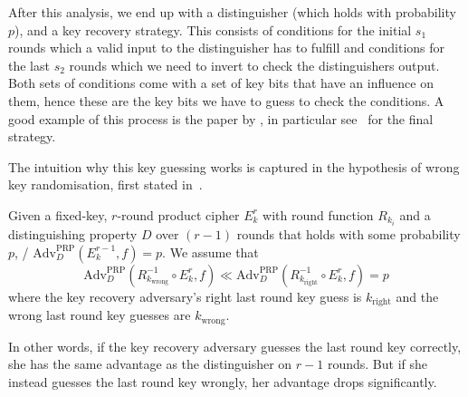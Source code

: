After this analysis, we end up with a distinguisher (which holds with probability~$p$), and a key recovery strategy.
This consists of conditions for the initial $s_1$ rounds which a valid input to the distinguisher has to fulfill and conditions for the last $s_2$ rounds which we need to invert to check the distinguishers output.
Both sets of conditions come with a set of key bits that have an influence on them, hence these are the key bits we have to guess to check the conditions.
A good example of this process is the paper by \citeauthor{INDOCRYPT:LalRas17}, in particular see~\cite[Section~6.3, pp.~14f]{INDOCRYPT:LalRas17} for the final strategy.

The intuition why this key guessing works is captured in the hypothesis of wrong key randomisation, first stated in~\cite[Section~4]{EC:HarKraMas95}.
\begin{hypothesis}\label{hypo:rand}
    Given a fixed-key, $r$-round product cipher $E_k^r$ with round function $R_{k_i}$ and a distinguishing property $D$ over $(r-1)$ rounds that holds with some probability $p$, \ie/ $\mathrm{Adv}_D^\mathrm{PRP}(E_k^{r-1}, f) = p$.
    We assume that
    \begin{equation*}
        \mathrm{Adv}_D^\mathrm{PRP}(R_{k_{\text{wrong}}}^{-1} \circ E_k^r, f) \ll \mathrm{Adv}_D^\mathrm{PRP}(R_{k_{\text{right}}}^{-1} \circ E_k^r, f) = p
    \end{equation*}
    where the key recovery adversary's right last round key guess is $k_{\text{right}}$ and the wrong last round key guesses are $k_{\text{wrong}}$.
\end{hypothesis}
In other words, if the key recovery adversary guesses the last round key correctly, she has the same advantage as the distinguisher on $r-1$ rounds.
But if she instead guesses the last round key wrongly, her advantage drops significantly.

